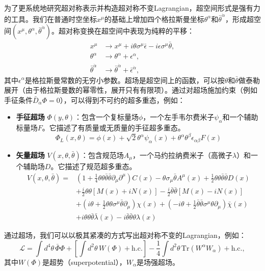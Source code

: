为了更系统地研究超对称表示并构造超对称不变Lagrangian，超空间形式是强有力的工具。我们在普通时空坐标$x^\mu$的基础上增加四个格拉斯曼坐标$\theta^\alpha$和$\bar\theta^{\dot\alpha}$，形成超空间$(x^\mu, \theta^\alpha, \bar\theta^{\dot\alpha})$。超对称变换在超空间中表现为纯粹的平移：
\begin{align}
x^\mu &\to x^\mu + i\theta\sigma^\mu\bar\epsilon - i\epsilon\sigma^\mu\bar\theta, \\
\theta^\alpha &\to \theta^\alpha + \epsilon^\alpha, \\
\bar\theta^{\dot\alpha} &\to \bar\theta^{\dot\alpha} + \bar\epsilon^{\dot\alpha},
\end{align}
其中$\epsilon^\alpha$是格拉斯曼常数的无穷小参数。超场是超空间上的函数，可以按$\theta$和$\bar\theta$做泰勒展开（由于格拉斯曼数的幂零性，展开只有有限项）。通过对超场施加约束（例如手征条件$\bar D_\alpha \Phi = 0$），可以得到不可约的超多重态，例如：
\begin{itemize}
\item \textbf{手征超场} $\Phi(y,\theta)$：包含一个复标量场$\phi$，一个左手韦尔费米子$\psi_\alpha$和一个辅助标量场$F$。它描述了有质量或无质量的手征超多重态。
\begin{equation}
    \Phi_L(x,\theta) = \phi(x) + \sqrt{2}\theta^\alpha \psi_\alpha(x) + \theta^\alpha\theta^\beta \epsilon_{\alpha\beta}F(x)
\end{equation}
\item \textbf{矢量超场} $V(x,\theta,\bar\theta)$：包含规范场$A_\mu$，一个马约拉纳费米子（高微子$\lambda$）和一个辅助场$D$。它描述了规范超多重态。
\begin{equation}
\begin{split}
    V(x,\theta,\bar{\theta}) =& (1+\frac{1}{4}\theta\theta\bar{\theta}\bar{\theta}\partial_\mu\partial^\mu)C(x) -\theta\sigma_\mu\bar{\theta}A^\mu(x)+\frac{1}{2}\theta\theta\bar{\theta}\bar{\theta}D(x) \\
    &+\frac{i}{2}\theta\theta[M(x) + iN(x)]
    -\frac{i}{2}\bar{\theta}\bar{\theta}[M(x) - iN(x)]\\
    &+ (i\theta + \frac{1}{2}\theta\theta\sigma^\mu\bar{\theta}\partial_\mu)\chi(x) +(-i\theta + \frac{1}{2}\bar{\theta}\bar{\theta}\sigma^\mu{\theta}\partial_\mu)\bar{\chi}(x)\\
    &+i\theta\theta\bar{\theta}\bar{\lambda}(x) - i\bar{\theta}\bar{\theta}\theta\lambda(x)
    \end{split}
\end{equation}
\end{itemize}
通过超场，我们可以以极其紧凑的方式写出超对称不变的Lagrangian，例如：
\begin{equation}
\mathcal{L} = \int d^4\theta \, \bar\Phi \Phi + \left[ \int d^2\theta \, W(\Phi) + \text{h.c.} \right] - \frac14 \int d^2\theta \, \mathrm{Tr}(W^\alpha W_\alpha) + \text{h.c.},
\end{equation}
其中$W(\Phi)$是超势（superpotential），$W_\alpha$是场强超场。


